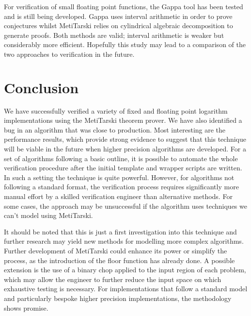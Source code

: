 \documentclass[a4paper]{article}
\begin{document}
For verification of small floating point functions, the Gappa tool \cite{de2006assisted,boldo2009combining} has been tested and is still being developed. Gappa uses interval arithmetic in order to prove conjectures whilst MetiTarski relies on cylindrical algebraic decomposition to generate proofs. Both methods are valid; interval arithmetic is weaker but considerably more efficient. Hopefully this study may lead to a comparison of the two approaches to verification in the future.

\section{Conclusion}
We have successfully verified a variety of fixed and floating point logarithm implementations using the MetiTarski theorem prover.
We have also identified a bug in an algorithm that was close to production. Most interesting are the performance results, which provide strong evidence to suggest that this technique will be viable in the future when higher precision algorithms are developed. For a set of algorithms following a basic outline, it is possible to automate the whole verification procedure after the initial template and wrapper scripts are written. In such a setting the technique is quite powerful. However, for algorithms not following a standard format, the verification process requires significantly more manual effort by a skilled verification engineer than alternative methods. For some cases, the approach may be unsuccessful if the algorithm uses techniques we can't model using MetiTarski. 

It should be noted that this is just a first investigation into this technique and further research may yield new methods for modelling more complex algorithms. Further development of MetiTarski could enhance its power or simplify the process, as the introduction of the floor function has already done. A possible extension is the use of a binary chop applied to the input region of each problem, which may allow the engineer to further reduce the input space on which exhaustive testing is necessary. For implementations that follow a standard model and particularly bespoke higher precision implementations, the methodology shows promise.


\end{document}
